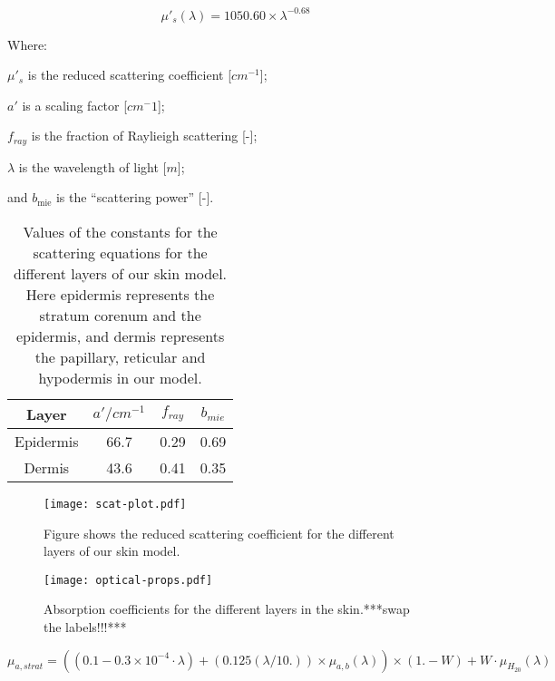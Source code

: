\begin{equation}
\mu'_s(\lambda)=1050.60\times\lambda^{-0.68}
\label{eqn:hyposcat}
\end{equation}


\noindent Where:

	$\mu'_s$ is the reduced scattering coefficient [$cm^{-1}$];

	$a'$ is a scaling factor [$cm^-1$];

	$f_{ray}$ is the fraction of Raylieigh scattering [-];

	$\lambda$ is the wavelength of light [$m$];

	and $b_{\text{mie}}$ is the ``scattering power'' [-].

\begin{table}[!htpb]
  \centering

  \begin{tabular}{|c|c|c|c|}
  \hline

  Layer & $a'/cm^{-1}$ & $f_{ray}$ & $b_{mie}$ \\
  \hline
   Epidermis         & 66.7 & 0.29 & 0.69 \\
   Dermis  & 43.6 & 0.41 & 0.35 \\

  \hline
  \end{tabular}
  \caption{Values of the constants for the scattering equations for the different layers of our skin model. Here epidermis represents the stratum corenum and the epidermis, and dermis represents the papillary, reticular and hypodermis in our model.}
  \label{tab:valscat}

\end{table}

\begin{figure}[!htpb]
	\centering
	\texttt{[image: scat-plot.pdf]}
	\caption{Figure shows the reduced scattering coefficient for the different layers of our skin model.}
	\label{fig:scatplot}
\end{figure}



\begin{figure}[!htpb]
  \centering
  \texttt{[image: optical-props.pdf]}
  \caption{Absorption coefficients for the different layers in the skin.***swap the labels!!!***}
  \label{fig:absoplayers}
\end{figure}


\begin{equation}
\mu_{a,strat}= ((0.1 - 0.3\times10^{-4}\cdot\lambda) + (0.125(\lambda/10.))\times \mu_{a,b}(\lambda))\times(1. - W) + W\cdot\mu_{H_20}(\lambda)
\end{equation}

